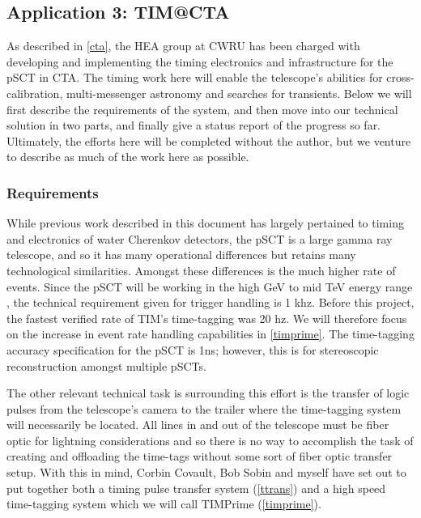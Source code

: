 \subsection{Application 3: TIM@CTA}
\label{timatcta}%
As described in \autoref{cta}, the HEA group at CWRU has been charged with developing and implementing the timing electronics and infrastructure for the pSCT in CTA. The timing work here will enable the telescope's abilities for cross-calibration, multi-messenger astronomy and searches for transients. Below we will first describe the requirements of the system, and then move into our technical solution in two parts, and finally give a status report of the progress so far. Ultimately, the efforts here will be completed without the author, but we venture to describe as much of the work here as possible.
\subsubsection{Requirements}
While previous work described in this document has largely pertained to timing and electronics of water Cherenkov detectors, the pSCT is a large gamma ray telescope, and so it has many operational differences but retains many technological similarities. Amongst these differences is the much higher rate of events. Since the pSCT will be working in the high GeV to mid TeV energy range \cite{ctaong},  the technical requirement given for trigger handling is 1 khz. Before this project, the fastest verified rate of TIM's time-tagging was 20 hz. We will therefore focus on the increase in event rate handling capabilities in \autoref{timprime}. The time-tagging accuracy specification for the pSCT is 1ns; however, this is for stereoscopic reconstruction amongst multiple pSCTs.

The other relevant technical task is surrounding this effort is the transfer of logic pulses from the telescope's camera to the trailer where the time-tagging system will necessarily be located. All lines in and out of the telescope must be fiber optic for lightning considerations and so there is no way to accomplish the task of creating and offloading the time-tags without some sort of fiber optic transfer setup. With this in mind, Corbin Covault, Bob Sobin and myself have set out to put together both a timing pulse transfer system (\autoref{ttrans}) and a high speed time-tagging system which we will call TIMPrime (\autoref{timprime}).


